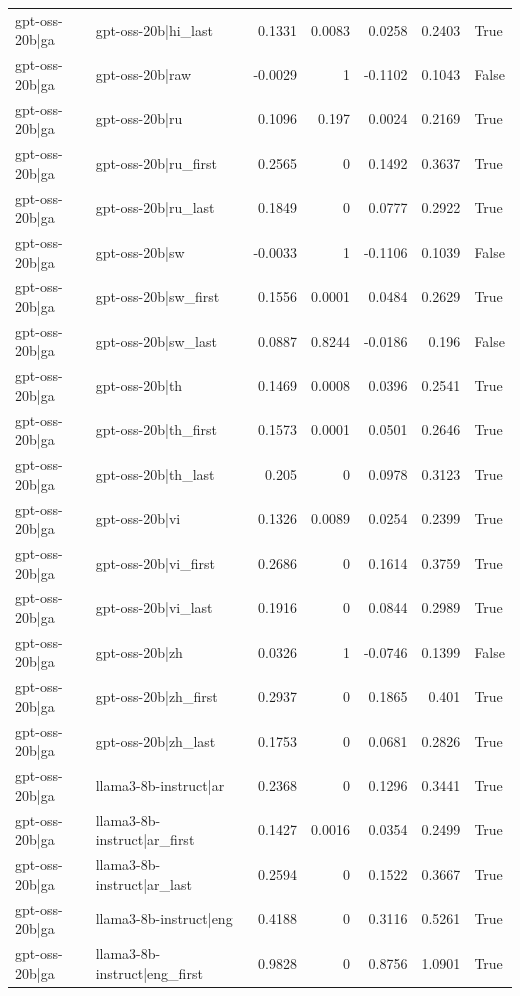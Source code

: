 \begin{table}
\begin{tabular}{l l r r r r l}
gpt-oss-20b|ga & gpt-oss-20b|hi_last & 0.1331 & 0.0083 & 0.0258 & 0.2403 & True \\
gpt-oss-20b|ga & gpt-oss-20b|raw & -0.0029 & 1 & -0.1102 & 0.1043 & False \\
gpt-oss-20b|ga & gpt-oss-20b|ru & 0.1096 & 0.197 & 0.0024 & 0.2169 & True \\
gpt-oss-20b|ga & gpt-oss-20b|ru_first & 0.2565 & 0 & 0.1492 & 0.3637 & True \\
gpt-oss-20b|ga & gpt-oss-20b|ru_last & 0.1849 & 0 & 0.0777 & 0.2922 & True \\
gpt-oss-20b|ga & gpt-oss-20b|sw & -0.0033 & 1 & -0.1106 & 0.1039 & False \\
gpt-oss-20b|ga & gpt-oss-20b|sw_first & 0.1556 & 0.0001 & 0.0484 & 0.2629 & True \\
gpt-oss-20b|ga & gpt-oss-20b|sw_last & 0.0887 & 0.8244 & -0.0186 & 0.196 & False \\
gpt-oss-20b|ga & gpt-oss-20b|th & 0.1469 & 0.0008 & 0.0396 & 0.2541 & True \\
gpt-oss-20b|ga & gpt-oss-20b|th_first & 0.1573 & 0.0001 & 0.0501 & 0.2646 & True \\
gpt-oss-20b|ga & gpt-oss-20b|th_last & 0.205 & 0 & 0.0978 & 0.3123 & True \\
gpt-oss-20b|ga & gpt-oss-20b|vi & 0.1326 & 0.0089 & 0.0254 & 0.2399 & True \\
gpt-oss-20b|ga & gpt-oss-20b|vi_first & 0.2686 & 0 & 0.1614 & 0.3759 & True \\
gpt-oss-20b|ga & gpt-oss-20b|vi_last & 0.1916 & 0 & 0.0844 & 0.2989 & True \\
gpt-oss-20b|ga & gpt-oss-20b|zh & 0.0326 & 1 & -0.0746 & 0.1399 & False \\
gpt-oss-20b|ga & gpt-oss-20b|zh_first & 0.2937 & 0 & 0.1865 & 0.401 & True \\
gpt-oss-20b|ga & gpt-oss-20b|zh_last & 0.1753 & 0 & 0.0681 & 0.2826 & True \\
gpt-oss-20b|ga & llama3-8b-instruct|ar & 0.2368 & 0 & 0.1296 & 0.3441 & True \\
gpt-oss-20b|ga & llama3-8b-instruct|ar_first & 0.1427 & 0.0016 & 0.0354 & 0.2499 & True \\
gpt-oss-20b|ga & llama3-8b-instruct|ar_last & 0.2594 & 0 & 0.1522 & 0.3667 & True \\
gpt-oss-20b|ga & llama3-8b-instruct|eng & 0.4188 & 0 & 0.3116 & 0.5261 & True \\
gpt-oss-20b|ga & llama3-8b-instruct|eng_first & 0.9828 & 0 & 0.8756 & 1.0901 & True \\

\end{tabular}
\end{table}
